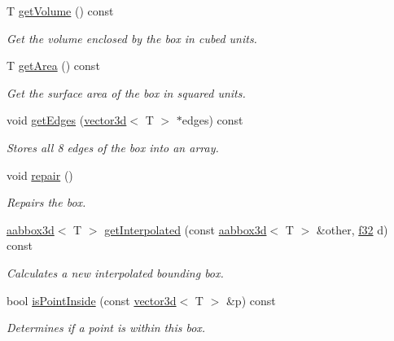 \begin{DoxyCompactItemize}
T \hyperlink{classirr_1_1core_1_1aabbox3d_a780f6f14562aa550ba7d90ac079f23ec}{get\+Volume} () const
\begin{DoxyCompactList}\small\item\em Get the volume enclosed by the box in cubed units. \end{DoxyCompactList}\item 
\mbox{\label{classirr_1_1core_1_1aabbox3d_a8566c5c5c73b56ecd15e857a08ddc7dd}} 
T \hyperlink{classirr_1_1core_1_1aabbox3d_a8566c5c5c73b56ecd15e857a08ddc7dd}{get\+Area} () const
\begin{DoxyCompactList}\small\item\em Get the surface area of the box in squared units. \end{DoxyCompactList}\item 
void \hyperlink{classirr_1_1core_1_1aabbox3d_acb31d9c6a79559c2636c1e32a3e2e459}{get\+Edges} (\hyperlink{classirr_1_1core_1_1vector3d}{vector3d}$<$ T $>$ $\ast$edges) const
\begin{DoxyCompactList}\small\item\em Stores all 8 edges of the box into an array. \end{DoxyCompactList}\item 
void \hyperlink{classirr_1_1core_1_1aabbox3d_a904b14e6b6a99187820a7407b5d7cf23}{repair} ()
\begin{DoxyCompactList}\small\item\em Repairs the box. \end{DoxyCompactList}\item 
\hyperlink{classirr_1_1core_1_1aabbox3d}{aabbox3d}$<$ T $>$ \hyperlink{classirr_1_1core_1_1aabbox3d_a2c2073f3693819d99906f2ae36dd19de}{get\+Interpolated} (const \hyperlink{classirr_1_1core_1_1aabbox3d}{aabbox3d}$<$ T $>$ \&other, \hyperlink{namespaceirr_a0277be98d67dc26ff93b1a6a1d086b07}{f32} d) const
\begin{DoxyCompactList}\small\item\em Calculates a new interpolated bounding box. \end{DoxyCompactList}\item 
bool \hyperlink{classirr_1_1core_1_1aabbox3d_ae69d28e1e512f705a6cbf95c5829f6cd}{is\+Point\+Inside} (const \hyperlink{classirr_1_1core_1_1vector3d}{vector3d}$<$ T $>$ \&p) const
\begin{DoxyCompactList}\small\item\em Determines if a point is within this box. \end{DoxyCompactList}\item 

\end{DoxyCompactItemize}
